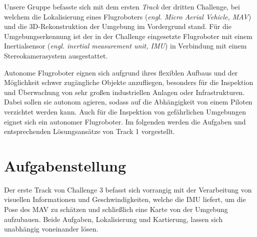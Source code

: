 \documentclass[12pt,titlepage, a4paper]{article}
\begin{document}
Unsere Gruppe befasste sich mit dem ersten \textit{Track} der dritten Challenge, bei welchem die Lokalisierung eines Flugroboters (\textit{engl. Micro Aerial Vehicle, MAV}) und die 3D-Rekonstruktion 
der Umgebung im Vordergrund stand.
Für die Umgebungserkennung ist der in der Challenge eingesetzte Flugroboter mit einem Inertialsensor (\textit{engl. inertial measurement unit, IMU}) in Verbindung mit einem Stereokamerasystem ausgestattet. 


Autonome Flugroboter eignen sich aufgrund ihres flexiblen Aufbaus und der Möglichkeit schwer zugängliche Objekte anzufliegen, besonders für die Inspektion und Überwachung von sehr großen industriellen
Anlagen oder Infrastrukturen. Dabei sollen sie autonom agieren, sodass auf die Abhängigkeit von einem Piloten verzichtet werden kann.
Auch für die Inspektion von gefährlichen Umgebungen eignet sich ein autonomer Flugroboter.
Im folgenden werden die Aufgaben und entsprechenden Lösungsansätze von Track 1 vorgestellt.





\section{Aufgabenstellung} 
Der erste Track von Challenge 3 befasst sich vorrangig mit der Verarbeitung von visuellen Informationen und Geschwindigkeiten, welche die IMU liefert, um die Pose des MAV zu schätzen
und schließlich eine Karte von der Umgebung aufzubauen. Beide Aufgaben, Lokalisierung und Kartierung, lassen sich unabhängig voneinander lösen.
\end{document}
